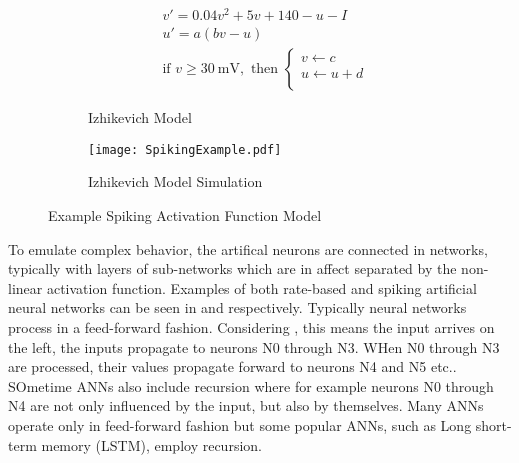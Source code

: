 \begin{figure}
\centering
\captionsetup{justification=centering}
\vspace{0.5cm}
\begin{subfigure}{.9\textwidth}
  \centering
  \begin{equation}
    \begin{split}
    &v' = 0.04v^2+5v + 140 - u - I\\
    &u' = a(bv-u)  \\
    &\text{if } v\ge  \SI{30}{\mV}, \text{ then } 
    \begin{cases}
        v \leftarrow c\\           
        u \leftarrow u+d\\           
    \end{cases} \nonumber
    \end{split}
  \end{equation}
  \caption{Izhikevich Model\cite{Iz2005}}
  \label{fig:Izhikevich Model}
  \end{subfigure}
\begin{subfigure}{.7\textwidth}
  \centering
  \mbox{\texttt{[image: SpikingExample.pdf]}}
  \captionsetup{justification=centering, skip=3pt}
  \caption{Izhikevich \cite{Iz2005} Model Simulation}
  \label{fig:spiking example}
\end{subfigure}
\caption{Example Spiking Activation Function Model}
\label{fig:Example Spiking Model}
\end{figure}

To emulate complex behavior, the artifical neurons are connected in networks, typically with layers of sub-networks which are in affect separated by the non-linear activation function.
Examples of both rate-based and spiking artificial neural networks can be seen in  and  respectively.
Typically neural networks process in a feed-forward fashion. Considering , this means the input arrives on the left, the inputs propagate to neurons N0 through N3. WHen N0 through N3 are processed, their values propagate forward to neurons N4 and N5 etc.. SOmetime ANNs also include recursion where for example neurons N0 through N4 are not only influenced
by the input, but also by themselves. Many ANNs operate only in feed-forward fashion but some popular ANNs, such as Long short-term memory (LSTM), employ recursion.

